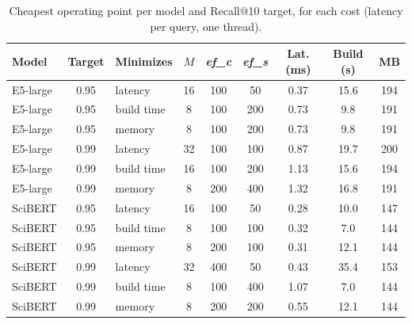 \begin{table}[tbp]
\caption{Cheapest operating point per model and Recall@10 target, for each cost (latency per query, one thread).}\label{tab:seleccion}
\centering
\small
\begin{tabular}{|l|c|l|c|c|c|c|c|c|}
\hline
\textbf{Model} & \textbf{Target} & \textbf{Minimizes} & \textbf{$M$} & \textbf{\textit{ef\_c}} & \textbf{\textit{ef\_s}} & \textbf{Lat. (ms)} & \textbf{Build (s)} & \textbf{MB} \\
\hline
E5-large & 0.95 & latency & 16 & 100 & 50 & 0.37 & 15.6 & 194 \\
E5-large & 0.95 & build time & 8 & 100 & 200 & 0.73 & 9.8 & 191 \\
E5-large & 0.95 & memory & 8 & 100 & 200 & 0.73 & 9.8 & 191 \\
E5-large & 0.99 & latency & 32 & 100 & 100 & 0.87 & 19.7 & 200 \\
E5-large & 0.99 & build time & 16 & 100 & 200 & 1.13 & 15.6 & 194 \\
E5-large & 0.99 & memory & 8 & 200 & 400 & 1.32 & 16.8 & 191 \\
SciBERT & 0.95 & latency & 16 & 100 & 50 & 0.28 & 10.0 & 147 \\
SciBERT & 0.95 & build time & 8 & 100 & 100 & 0.32 & 7.0 & 144 \\
SciBERT & 0.95 & memory & 8 & 200 & 100 & 0.31 & 12.1 & 144 \\
SciBERT & 0.99 & latency & 32 & 400 & 50 & 0.43 & 35.4 & 153 \\
SciBERT & 0.99 & build time & 8 & 100 & 400 & 1.07 & 7.0 & 144 \\
SciBERT & 0.99 & memory & 8 & 200 & 200 & 0.55 & 12.1 & 144 \\
\hline
\end{tabular}
\end{table}
